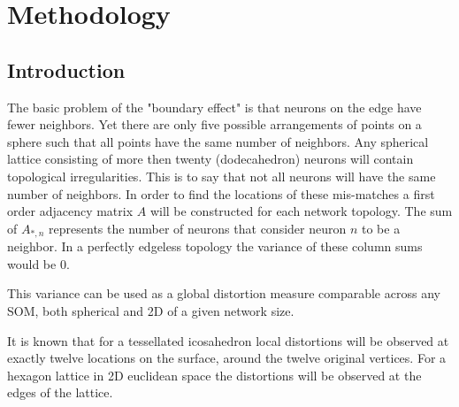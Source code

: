 \documentclass[11pt]{article}
\begin{document}

\section{Methodology}
\subsection{Introduction}
The basic problem of the "boundary effect" is that neurons on the edge have
fewer neighbors. Yet there are only five possible arrangements of points on a
sphere such that all points have the same number of neighbors.  Any spherical
lattice consisting of more then twenty (dodecahedron) neurons will contain
topological irregularities.  This is to say that not all neurons will have the
same number of neighbors.  In order to find the locations of these mis-matches a
first order adjacency matrix \(A\) will be constructed for each network
topology.  The sum of \(A_{*,n}\) represents the number of neurons that consider
neuron \(n\) to be a neighbor.  In a perfectly edgeless topology the variance of
these column sums would be \(0\).

This variance can be used as a global distortion measure comparable across any SOM, both spherical and 2D of a given network size.

It is known that for a tessellated icosahedron local distortions
will be observed at exactly twelve locations on the surface, around the twelve
original vertices.  For a hexagon lattice in 2D euclidean space the
distortions will be observed at the edges of the lattice.  
\end{document}
